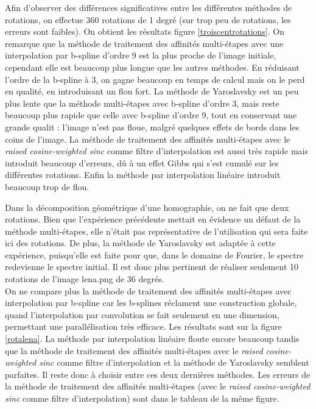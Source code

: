 	Afin d'observer des différences significatives entre les différentes méthodes de rotations, on effectue 360 rotations de 1 degré (sur trop peu de rotations, les erreurs sont faibles). On obtient les résultats figure \ref{troiscentrotations}.  On remarque que la méthode de traitement des affinités multi-étapes avec une interpolation par b-spline d'ordre 9 est la plus proche de l'image initiale, cependant elle est beaucoup plus longue que les autres méthodes. En réduisant l'ordre de la b-spline à 3, on gagne beaucoup en temps de calcul mais on le perd en qualité, en introduisant un flou fort. La méthode de Yaroslavsky est un peu plus lente que la méthode multi-étapes avec b-spline d'ordre 3, mais reste beaucoup plus rapide que celle avec b-spline d'ordre 9, tout en conservant une grande qualit : l'image n'est pas floue, malgré quelques effets de bords dans les coins de l'image. La méthode de traitement des affinités multi-étapes avec le \emph{raised cosine-weighted sinc} comme filtre d'interpolation est aussi très rapide mais introduit beaucoup d'erreurs, dû à un effet Gibbs qui s'est cumulé sur les différentes rotations. Enfin la méthode par interpolation linéaire introduit beaucoup trop de flou.\\
\label{pleinsderotations}
	
	Dans la décomposition géométrique d'une homographie, on ne fait que deux rotations. Bien que l'expérience précédente mettait en évidence un défaut de la méthode multi-étapes, elle n'était pas représentative de l'utilisation qui sera faite ici des rotations. De plus, la méthode de Yaroslavsky est adaptée à cette expérience, puisqu'elle est faite pour que, dans le domaine de Fourier, le spectre redevienne le spectre initial. Il est donc plus pertinent de réaliser seulement 10 rotations de l'image lena.png de 36 degrés.\\

	On ne compare plus la méthode de traitement des affinités multi-étapes avec interpolation par b-spline car les b-splines réclament une construction globale, quand l'interpolation par convolution se fait seulement en une dimension, permettant une parallélisation très efficace. Les résultats sont sur la figure \ref{rotalena}. La méthode par interpolation linéaire floute encore beaucoup tandis que la méthode de traitement des affinités multi-étapes avec le \emph{raised cosine-weighted sinc} comme filtre d'interpolation et la méthode de Yaroslavsky semblent parfaites. Il reste donc à choisir entre ces deux dernières méthodes. Les erreurs de la méthode de traitement des affinités multi-étapes (avec le \emph{raised cosine-weighted sinc} comme filtre d'interpolation) sont dans le tableau de la même figure.\\

